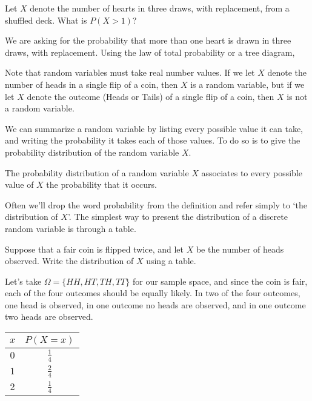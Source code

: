 \begin{examp} Let $X$ denote the number of hearts in three draws, with replacement, from a shuffled deck. What is $P(X > 1)$?
\par
\noindent We are asking for the probability that more than one heart is drawn in three draws, with replacement. Using the law of total probability or a tree diagram,
\end{examp}
\par

\begin{rmk} Note that random variables must take real number values. If we let $X$ denote the number of heads in a single flip of a coin, then $X$ is a random variable, but if we let $X$ denote the outcome (Heads or Tails) of a single flip of a coin, then $X$ is not a random variable.
\end{rmk}

We can summarize a random variable by listing every possible value it can take, and writing the probability it takes each of those values. To do so is to give the probability distribution of the random variable $X$. 

\begin{defn}
The probability distribution of a random variable $X$ associates to every possible value of $X$ the probability that it occurs.
\end{defn}

Often we'll drop the word probability from the definition and refer simply to `the distribution of $X$'. The simplest way to present the distribution of a discrete random variable is through a table.

\begin{examp} Suppose that a fair coin is flipped twice, and let $X$ be the number of heads observed. Write the distribution of $X$ using a table.
\par
\noindent
Let's take $\Omega = \{HH, HT, TH, TT\}$ for our sample space, and since the coin is fair, each of the four outcomes should be equally likely. In two of the four outcomes, one head is observed, in one outcome no heads are observed, and in one outcome two heads are observed.
\renewcommand*{\arraystretch}{1.35}
\begin{center}
\begin{tabular}{c|c}
$x$ & $P(X = x)$ \\
\hline
$0$ & $\frac{1}{4}$ \\
$1$ & $\frac{2}{4}$ \\
$2$ & $\frac{1}{4}$ \\
\end{tabular}
\end{center}
\renewcommand*{\arraystretch}{1}
\end{examp}

